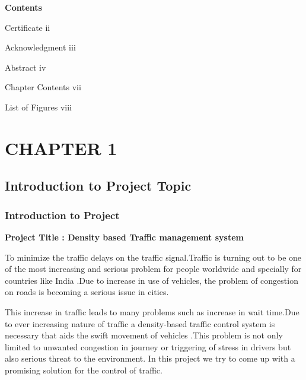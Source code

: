\documentclass[12pt,a4paper]{report}
\begin{document}
\newpage
\begin{center}
	\textbf{\large {Contents}}
\end{center}

Certificate \hspace{235pt} 	ii

Acknowledgment \hspace{200pt} iii

Abstract \hspace{242pt} iv

Chapter Contents \hspace{195pt} vii

List of Figures \hspace{211pt} viii



\tableofcontents 

\listoffigures


\newpage


\chapter{\textbf{\Large{CHAPTER 1}}}
\section{\textbf{\large {Introduction to Project Topic}}}
\subsection{ Introduction to Project}
\begin{center}
	\textbf{\Large{Project Title  : Density based Traffic management system }}
\end{center}
	To minimize the traffic delays on the traffic signal.Traffic is turning out to be one of the most increasing and serious problem for people worldwide and specially for countries like India .Due to increase in use of vehicles, the problem of congestion on roads is becoming a serious issue in cities.\par
This increase in traffic leads to many problems such as increase in wait time.Due to ever increasing nature of traffic a density-based traffic control system is necessary that aids the swift movement of vehicles .This problem is not only limited to unwanted congestion in journey or triggering of stress in drivers but also serious threat to the environment. In this project we try to come up with a promising solution for the control of traffic.\par
\end{document}

